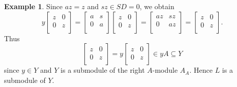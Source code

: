 \documentclass[11pt,a4paper]{amsart}
\theoremstyle{plain}
\theoremstyle{definition}
\newtheorem{example}[theorem]{Example}
\theoremstyle{remark}
\begin{document}
\begin{example}
{Since $az=z$ and $sz\in SD=0$, we obtain
\[y\left[
                                 \begin{array}{ll}
                                   z & 0 \\
                                   0 & z \\
                                 \end{array}
                               \right]=\left[
                                 \begin{array}{ll}
                                   a & s \\
                                   0 & a \\
                                 \end{array}
                               \right]\left[
                                 \begin{array}{ll}
                                   z & 0 \\
                                   0 & z \\
                                 \end{array}
                               \right]=\left[
                                 \begin{array}{ll}
                                   az & sz \\
                                   0 & az \\
                                 \end{array}
                               \right]=\left[
                                 \begin{array}{ll}
                                   z & 0 \\
                                   0 & z \\
                                 \end{array}
                               \right].
                               \]
                               Thus
\[
\left[
                                 \begin{array}{ll}
                                   z & 0 \\
                                   0 & z \\
                                 \end{array}
                               \right]
                               = y \left[
                                 \begin{array}{ll}
                                   z & 0 \\
                                   0 & z \\
                                 \end{array}
                               \right] \in yA \subseteq Y
\]
since $ y\in Y $ and $ Y $ is a submodule of the right $ A $-module $ A_A $. Hence $ L $ is a submodule of $ Y $.}



\end{example}
\end{document}
